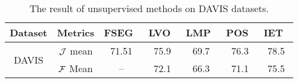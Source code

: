 \begin{table*}[t!h]
	\begin{center}
		\setlength\tabcolsep{3pt}
		\begin{tabular}{|c|c|c|c|c|c|c|}
		\hline
Dataset& Metrics                   &FSEG~\cite{Jain2017FusionSeg}  &LVO~\cite{Tokmakov2017Learning} &LMP~\cite{Tokmakov2017Learning} & POS~\cite{Koh2017Primary} &IET~\cite{li2018instance}\\
\hline
\multirow{2}{*}{DAVIS} &$\mathcal{J}$ mean  &71.51                           &75.9                           &69.7                            &76.3                          &78.5\\
\cline{2-7}
&$\mathcal{F}$ Mean                         &   --                           &72.1                           &66.3                            &71.1                          &75.5\\
\hline
\end{tabular}
\end{center}

\caption{The result of unsupervised methods on DAVIS datasets.}
\label{table:unsuperivsed_all_dataset}
\end{table*}